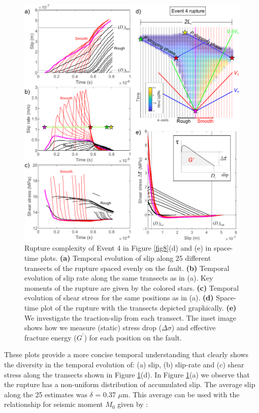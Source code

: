 \documentclass[draft]{agujournal2019}
\begin{document}
\begin{figure}
	\centering
	\includegraphics{FIG9.pdf} 
	\caption{Rupture complexity of Event 4 in Figure \ref{fig8}(d) and (e) in space-time plots.  \textbf{(a)} Temporal evolution of slip along 25 different transects of the rupture spaced evenly on the fault. \textbf{(b)} Temporal evolution of slip rate along the same transects as in (a). Key moments of the rupture are given by the colored stars. \textbf{(c)} Temporal evolution of shear stress for the same positions as in (a). \textbf{(d)} Space-time plot of the rupture with the transects depicted graphically. \textbf{(e)} We investigate the traction-slip from each transect. The inset image shows how we measure (static) stress drop ($\Delta \sigma$) and effective fracture energy ($G^{'}$) for each position on the fault.}
	\label{fig9}
	
\end{figure}

These plots provide a more concise temporal understanding that clearly shows the diversity in the temporal evolution of: (a) slip, (b) slip-rate and (c) shear stress along the transects shown in Figure \ref{fig9}(d). In Figure \ref{fig9}(a) we observe that the rupture has a non-uniform distribution of accumulated slip. The average slip along the 25 estimates was $\delta$ = 0.37 $\mu$m.  This average can be used with the relationship for seismic moment $M_{0}$ given by : 
\end{document}
